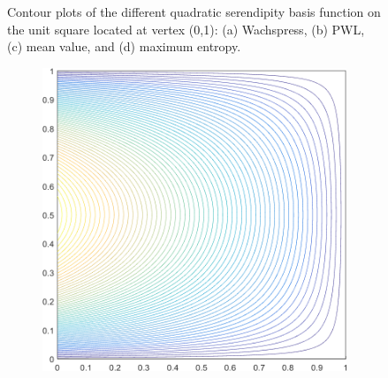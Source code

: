 \begin{figure}
\begin{subfigure}[b]{0.39\textwidth}
		\caption{}
	\end{subfigure}
\caption[Contour plots of the quadratic basis functions on the unit square.]{Contour plots of the different quadratic serendipity basis function on the unit square located at vertex (0,1): (a) Wachspress, (b) PWL, (c) mean value, and (d) maximum entropy.}
\end{figure}

\begin{figure}
\label{fig::2D_Quadratic_Summary_unit_square_basis_functions_BF8}
\centering
	\begin{subfigure}[b]{0.39\textwidth}
		\centering
		\includegraphics[width=\textwidth]{figures/sec_BF/square_WACHSPRESS2_contour_b8.png}
		\caption{}
	\end{subfigure}
	\hspace{1.5cm}
	\begin{subfigure}[b]{0.39\textwidth}
		\centering

\end{subfigure}
\end{figure}
